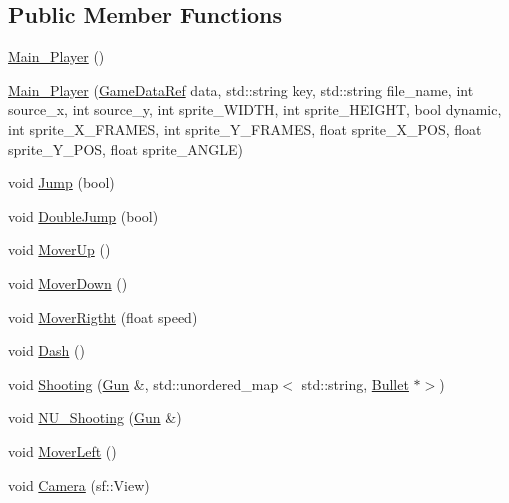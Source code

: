 \subsection*{Public Member Functions}
\begin{DoxyCompactItemize}
\item 
\hyperlink{classSekander_1_1Main__Player_a3db6385e3bff1d503b9305dd51952371}{Main\+\_\+\+Player} ()
\item 
\hyperlink{classSekander_1_1Main__Player_ad4c368b23e2e27a965a71dd5b5a9b8ba}{Main\+\_\+\+Player} (\hyperlink{namespaceSekander_a1d69b002ba2d23020901c28f0def5e16}{Game\+Data\+Ref} data, std\+::string key, std\+::string file\+\_\+name, int source\+\_\+x, int source\+\_\+y, int sprite\+\_\+\+W\+I\+D\+TH, int sprite\+\_\+\+H\+E\+I\+G\+HT, bool dynamic, int sprite\+\_\+\+X\+\_\+\+F\+R\+A\+M\+ES, int sprite\+\_\+\+Y\+\_\+\+F\+R\+A\+M\+ES, float sprite\+\_\+\+X\+\_\+\+P\+OS, float sprite\+\_\+\+Y\+\_\+\+P\+OS, float sprite\+\_\+\+A\+N\+G\+LE)
\item 
void \hyperlink{classSekander_1_1Main__Player_a5d37beaabf93f7c5b01578334da246a2}{Jump} (bool)
\item 
void \hyperlink{classSekander_1_1Main__Player_af62bb952d58130e6c79bf033c183df20}{Double\+Jump} (bool)
\item 
void \hyperlink{classSekander_1_1Main__Player_aaa5aa69d0e4947e24d3ea326f7142bc5}{Mover\+Up} ()
\item 
void \hyperlink{classSekander_1_1Main__Player_a72cd2d23a9d43627df23bf791d5fe08c}{Mover\+Down} ()
\item 
void \hyperlink{classSekander_1_1Main__Player_a5207bda5738aefb2d905170545f6e373}{Mover\+Rigtht} (float speed)
\item 
void \hyperlink{classSekander_1_1Main__Player_a2745801e5bd672d995a5fda6046535e4}{Dash} ()
\item 
void \hyperlink{classSekander_1_1Main__Player_a4ec697d86cc21197100f1ad5e9428aab}{Shooting} (\hyperlink{classSekander_1_1Gun}{Gun} \&, std\+::unordered\+\_\+map$<$ std\+::string, \hyperlink{classSekander_1_1Bullet}{Bullet} $\ast$$>$)
\item 
void \hyperlink{classSekander_1_1Main__Player_a870cb1809cf55fa050558d40c2d6f487}{N\+U\+\_\+\+Shooting} (\hyperlink{classSekander_1_1Gun}{Gun} \&)
\item 
void \hyperlink{classSekander_1_1Main__Player_a65ef67033301fad1550350ee12ae32d3}{Mover\+Left} ()
\item 
void \hyperlink{classSekander_1_1Main__Player_ac11f979e3ea8f386e0997336670e740b}{Camera} (sf\+::\+View)
$$
\end{DoxyCompactItemize}
